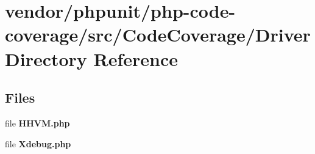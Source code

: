 \section{vendor/phpunit/php-\/code-\/coverage/src/\+Code\+Coverage/\+Driver Directory Reference}
\label{dir_e61ff0f64f868f2045125a8725814da4}
\subsection*{Files}
\begin{DoxyCompactItemize}
\item 
file {\bf H\+H\+V\+M.\+php}
\item 
file {\bf Xdebug.\+php}
\end{DoxyCompactItemize}
